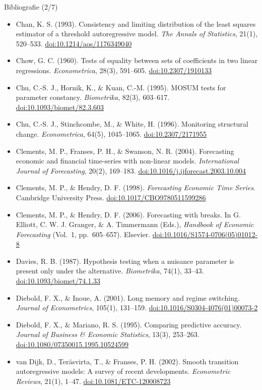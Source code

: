 \begin{frame}{Bibliografie (2/7)}
\itemsize{\tiny}
\begin{itemize}
    \item Chan, K. S. (1993). Consistency and limiting distribution of the least squares estimator of a threshold autoregressive model. \textit{The Annals of Statistics}, 21(1), 520--533. \href{https://doi.org/10.1214/aos/1176349040}{doi:10.1214/aos/1176349040}
    \item Chow, G. C. (1960). Tests of equality between sets of coefficients in two linear regressions. \textit{Econometrica}, 28(3), 591--605. \href{https://doi.org/10.2307/1910133}{doi:10.2307/1910133}
    \item Chu, C.-S. J., Hornik, K., \& Kuan, C.-M. (1995). MOSUM tests for parameter constancy. \textit{Biometrika}, 82(3), 603--617. \href{https://doi.org/10.1093/biomet/82.3.603}{doi:10.1093/biomet/82.3.603}
    \item Chu, C.-S. J., Stinchcombe, M., \& White, H. (1996). Monitoring structural change. \textit{Econometrica}, 64(5), 1045--1065. \href{https://doi.org/10.2307/2171955}{doi:10.2307/2171955}
    \item Clements, M. P., Franses, P. H., \& Swanson, N. R. (2004). Forecasting economic and financial time-series with non-linear models. \textit{International Journal of Forecasting}, 20(2), 169--183. \href{https://doi.org/10.1016/j.ijforecast.2003.10.004}{doi:10.1016/j.ijforecast.2003.10.004}
    \item Clements, M. P., \& Hendry, D. F. (1998). \textit{Forecasting Economic Time Series}. Cambridge University Press. \href{https://doi.org/10.1017/CBO9780511599286}{doi:10.1017/CBO9780511599286}
    \item Clements, M. P., \& Hendry, D. F. (2006). Forecasting with breaks. In G. Elliott, C. W. J. Granger, \& A. Timmermann (Eds.), \textit{Handbook of Economic Forecasting} (Vol.\ 1, pp.\ 605--657). Elsevier. \href{https://doi.org/10.1016/S1574-0706(05)01012-8}{doi:10.1016/S1574-0706(05)01012-8}
    \item Davies, R. B. (1987). Hypothesis testing when a nuisance parameter is present only under the alternative. \textit{Biometrika}, 74(1), 33--43. \href{https://doi.org/10.1093/biomet/74.1.33}{doi:10.1093/biomet/74.1.33}
    \item Diebold, F. X., \& Inoue, A. (2001). Long memory and regime switching. \textit{Journal of Econometrics}, 105(1), 131--159. \href{https://doi.org/10.1016/S0304-4076(01)00073-2}{doi:10.1016/S0304-4076(01)00073-2}
    \item Diebold, F. X., \& Mariano, R. S. (1995). Comparing predictive accuracy. \textit{Journal of Business \& Economic Statistics}, 13(3), 253--263. \href{https://doi.org/10.1080/07350015.1995.10524599}{doi:10.1080/07350015.1995.10524599}
    \item van Dijk, D., Teräsvirta, T., \& Franses, P. H. (2002). Smooth transition autoregressive models: A survey of recent developments. \textit{Econometric Reviews}, 21(1), 1--47. \href{https://doi.org/10.1081/ETC-120008723}{doi:10.1081/ETC-120008723}
\end{itemize}
\end{frame}

